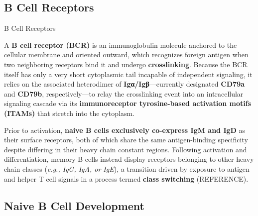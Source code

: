   \subsection{B Cell Receptors}

    \begin{core}{B Cell Receptors}

      A \textbf{B cell receptor (BCR)} is an immunoglobulin molecule anchored to the cellular membrane and oriented outward, which recognizes foreign antigen when two neighboring receptors bind it and undergo \textbf{crosslinking}. Because the BCR itself has only a very short cytoplasmic tail incapable of independent signaling, it relies on the associated heterodimer of \textbf{Igα/Igβ}---currently designated \textbf{CD79a} and \textbf{CD79b}, respectively---to relay the crosslinking event into an intracellular signaling cascade via its \textbf{immunoreceptor tyrosine-based activation motifs (ITAMs)} that stretch into the cytoplasm. 

      Prior to activation, \textbf{naive B cells exclusively co-express IgM and IgD} as their surface receptors, both of which share the same antigen-binding specificity despite differing in their heavy chain constant regions. Following activation and differentiation, memory B cells instead display receptors belonging to other heavy chain classes (\textit{e.g., IgG, IgA, or IgE}), a transition driven by exposure to antigen and helper T cell signals in a process termed \textbf{class switching} (REFERENCE).


    \end{core}

  \subsection{Naive B Cell Development}

